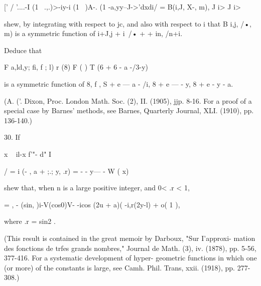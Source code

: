[' / '....-I (1 \ .,.)>-iy-i (1 \ )A-. (1 -a,yy--J->'dxdi/ = B(i,J,
X-, m), J i> J i>

shew, by integrating with respect to jc, and also with respect to i
that B i,j, /•, m) is a symmetric function of i+J,j + i\ /• + + in,
/n+i.

Deduce that

F a,ld,y; fi, f ; l) r (8) F ( ) T (6 + 6 - a -/3-y)

is a symmetric function of 8, f , S + e — a - /i, 8 + e — - y, 8 + e -
y - a.

(A. ('. Dixon, Proc. London Math. Soc. (2), II. (1905), jjp. 8-16. For
a proof of a special case by Barnes' methods, see Barnes, Quarterly
Journal, XLI. (1910), pp. 136-140.)

30. If

x ~ il-x f'"- d" I

/ = i (- , a + ;.; y, .r) = - - y— - W ( x) \

shew that, when n is a large positive integer, and 0< .r < 1,

  = , - (sin, )i-V(cos0)V- -icos (2u + a)( -i,r(2y-l) + o( 1 ),

where .r = sin2 .

(This result is contained in the great memoir by Darboux, "Sur
I'approxi- mation des fonctions de trfes grands nombres," Journal de
Math. (3), iv. (1878), pp. 5-56, 377-416. For a systematic development
of hyper- geometric functions in which one (or more) of the constants
is large, see Camh. Phil. Trans, xxii. (1918), pp. 277-308.)

